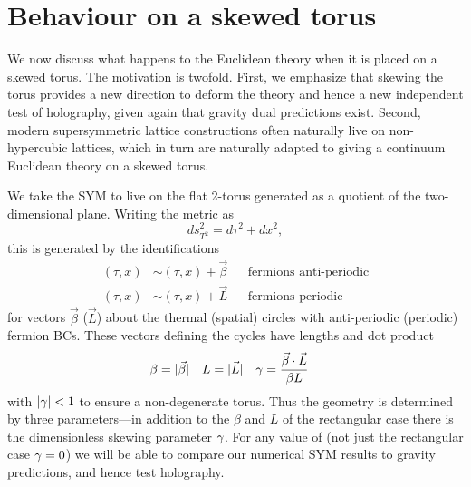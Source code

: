 \section{\label{sec:skewed}Behaviour on a skewed torus}
We now discuss what happens to the Euclidean theory when it is placed on a skewed torus.
The motivation is twofold.
First, we emphasize that skewing the torus provides a new direction to deform the theory and hence a new independent test of holography, given again that gravity dual predictions exist.
Second, modern supersymmetric lattice constructions often naturally live on non-hypercubic lattices, which in turn are naturally adapted to giving a continuum Euclidean theory on a skewed torus.

We take the SYM to live on the flat 2-torus generated as a quotient of the two-dimensional plane.
Writing the metric as
\begin{equation}
  ds^2_{T^2} = d\tau^2 + dx^2,
\end{equation}
this is generated by the identifications
\begin{align}
  (\tau, x) & \sim (\tau, x) + \vec{\beta} & & \text{fermions anti-periodic} \\
  (\tau, x) & \sim (\tau, x) + \vec L & & \text{fermions periodic}
\end{align}
for vectors $\vec{\beta}$ ($\vec L$) about the thermal (spatial) circles with anti-periodic (periodic) fermion BCs.
These vectors defining the cycles have lengths and dot product
\begin{align}
  \beta & = |\vec{\beta}| &
  L & = |\vec L| &
  \gamma & = \frac{\vec{\beta} \cdot \vec L}{\beta L}
\end{align}
with $|\gamma| < 1$ to ensure a non-degenerate torus.
Thus the geometry is determined by three parameters---in addition to the $\beta$ and $L$ of the rectangular case there is the dimensionless skewing parameter $\gamma$.
For any value of \ga (not just the rectangular case $\gamma = 0$) we will be able to compare our numerical SYM results to gravity predictions, and hence test holography.

